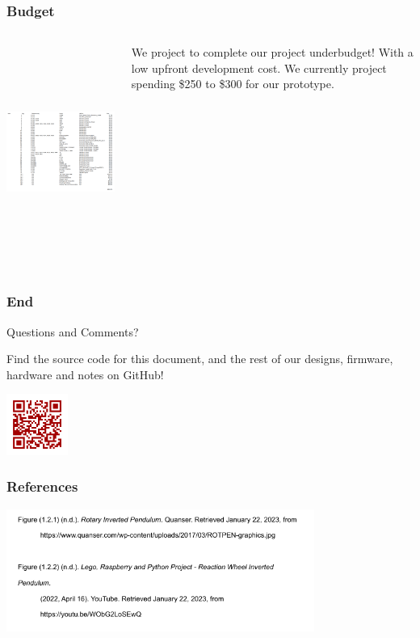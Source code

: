 \documentclass[aspectratio=169]{beamer}
\begin{document}
\begin{frame}
    \frametitle{Budget}

    \begin{columns}
        \begin{column}{0.70\textwidth}
            \includegraphics[height=7cm]{BOMTable}
        \end{column}

        \begin{column}{0.30\textwidth}
            We project to complete our project underbudget! With a low upfront development cost.
            We currently project spending \$250 to \$300 for our prototype.
        \end{column}
    \end{columns}
\end{frame}

\begin{frame}
    \frametitle{End}

    \begin{block}{}
        \begin{center}
            \Huge Questions and Comments?
        \end{center}
    \end{block}

    \begin{center}
        Find the source code for this document, and the rest of our designs, firmware, hardware
        and notes on GitHub!

        \includegraphics[height=2cm]{github_qr}
    \end{center}

\end{frame}

\begin{frame}
    \frametitle{References}

    \includegraphics[height=4cm]{references}
\end{frame}
\end{document}

